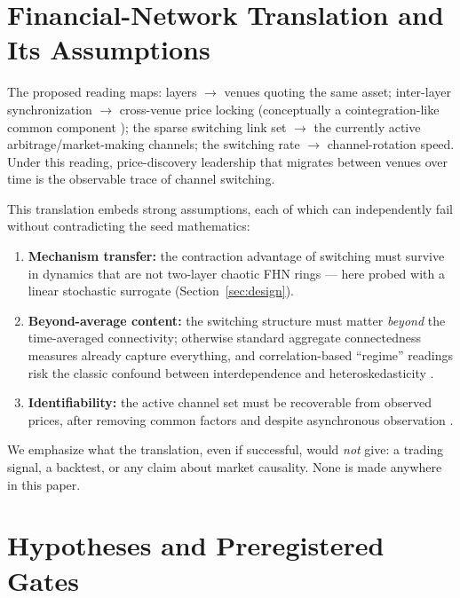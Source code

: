 \documentclass[11pt]{article}
\begin{document}
\section{Financial-Network Translation and Its Assumptions}
\label{sec:translation}

The proposed reading maps: layers $\to$ venues quoting the same asset;
inter-layer synchronization $\to$ cross-venue price locking (conceptually a
cointegration-like common component \citep{gonzalo1995estimation}); the sparse
switching link set $\to$ the currently active arbitrage/market-making
channels; the switching rate $\to$ channel-rotation speed. Under this reading,
price-discovery leadership that migrates between venues over time
\citep{hasbrouck1995one,baur2019price,alexander2020bitmex} is the observable
trace of channel switching.

This translation embeds strong assumptions, each of which can independently
fail without contradicting the seed mathematics:
\begin{enumerate}
  \item \textbf{Mechanism transfer:} the contraction advantage of switching
  must survive in dynamics that are not two-layer chaotic FHN rings --- here
  probed with a linear stochastic surrogate (Section~\ref{sec:design}).
  \item \textbf{Beyond-average content:} the switching structure must matter
  \emph{beyond} the time-averaged connectivity; otherwise standard aggregate
  connectedness measures \citep{diebold2009measuring,diebold2014network,engle2002dynamic}
  already capture everything, and correlation-based ``regime'' readings risk
  the classic confound between interdependence and heteroskedasticity
  \citep{forbes2002no}.
  \item \textbf{Identifiability:} the active channel set must be recoverable
  from observed prices, after removing common factors
  \citep{fan2013large,barigozzi2017network} and despite asynchronous
  observation \citep{epps1979comovements,hayashi2005covariance,scholes1977estimating}.
\end{enumerate}
We emphasize what the translation, even if successful, would \emph{not} give:
a trading signal, a backtest, or any claim about market causality. None is
made anywhere in this paper.

\section{Hypotheses and Preregistered Gates}
\label{sec:gates}
\end{document}
